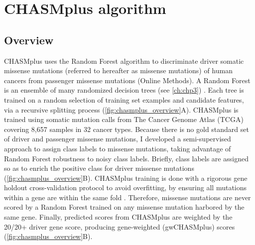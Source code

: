 \section{CHASMplus algorithm}

\subsection{Overview}
CHASMplus uses the Random Forest algorithm to discriminate driver somatic missense mutations (referred to hereafter as missense mutations) of human cancers from passenger missense mutations (Online Methods). A Random Forest is an ensemble of many randomized decision trees (see \autoref{ch:chp3}) \cite{RN41, RN40}. Each tree is trained on a random selection of training set examples and candidate features, via a recursive splitting process \cite{RN89}(\autoref{fig:chasmplus_overview}A). CHASMplus is trained using somatic mutation calls from The Cancer Genome Atlas (TCGA) covering 8,657 samples in 32 cancer types.  Because there is no gold standard set of driver and passenger missense mutations, I developed a semi-supervised approach to assign class labels to missense mutations, taking advantage of Random Forest robustness to noisy class labels.  Briefly, class labels are assigned so as to enrich the positive class for driver missense mutations (\autoref{fig:chasmplus_overview}B). CHASMplus training is done with a rigorous gene holdout cross-validation protocol to avoid overfitting, by ensuring all mutations within a gene are within the same fold \cite{RN128, RN137}. Therefore, missense mutations are never scored by a Random Forest trained on any missense mutation harbored by the same gene.  Finally, predicted scores from CHASMplus are weighted by the 20/20+ driver gene score, producing gene-weighted (gwCHASMplus) scores (\autoref{fig:chasmplus_overview}B).


